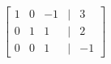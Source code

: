 \documentclass[preview]{standalone}
\begin{document}
\begin{align*}
\begin{bmatrix} 1 & 0 & -1 & | & 3 \\ 0 & 1 & 1 & | & 2 \\ 0 & 0 & 1 & | & -1 \end{bmatrix}\\
\end{align*}
\end{document}
